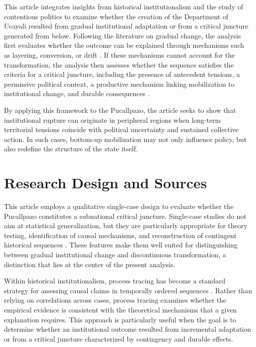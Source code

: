 \documentclass[12pt]{article}
\begin{document}
This article integrates insights from historical institutionalism and
the study of contentious politics to examine whether the creation of the
Department of Ucayali resulted from gradual institutional adaptation or
from a critical juncture generated from below. Following the literature
on gradual change, the analysis first evaluates whether the outcome can
be explained through mechanisms such as layering, conversion, or drift
\autocite{streeck_introduction_2005,mahoney_explaining_2010}. If these mechanisms
cannot account for the transformation, the analysis then assesses whether
the sequence satisfies the criteria for a critical juncture, including
the presence of antecedent tensions, a permissive political context, a
productive mechanism linking mobilization to institutional change, and
durable consequences
\autocite{collier_shaping_1991,capoccia_study_2007,slater_informative_2010}.

By applying this framework to the Pucallpazo, the article seeks to show
that institutional rupture can originate in peripheral regions when
long-term territorial tensions coincide with political uncertainty and
sustained collective action. In such cases, bottom-up mobilization may
not only influence policy, but also redefine the structure of the state
itself.

\section{Research Design and Sources}

This article employs a qualitative single-case design to evaluate
whether the Pucallpazo constitutes a subnational critical juncture.
Single-case studies do not aim at statistical generalization, but they
are particularly appropriate for theory testing, identification of causal
mechanisms, and reconstruction of contingent historical sequences
\autocite{george_case_2005,bennett_elman_2006}. These features make
them well suited for distinguishing between gradual institutional change
and discontinuous transformation, a distinction that lies at the center
of the present analysis.

Within historical institutionalism, process tracing has become a
standard strategy for assessing causal claims in temporally ordered
sequences \autocite{mahoney_historical_2009,capoccia_study_2007}. Rather than
relying on correlations across cases, process tracing examines whether
the empirical evidence is consistent with the theoretical mechanisms that
a given explanation requires. This approach is particularly useful when
the goal is to determine whether an institutional outcome resulted from
incremental adaptation or from a critical juncture characterized by
contingency and durable effects.
\end{document}
